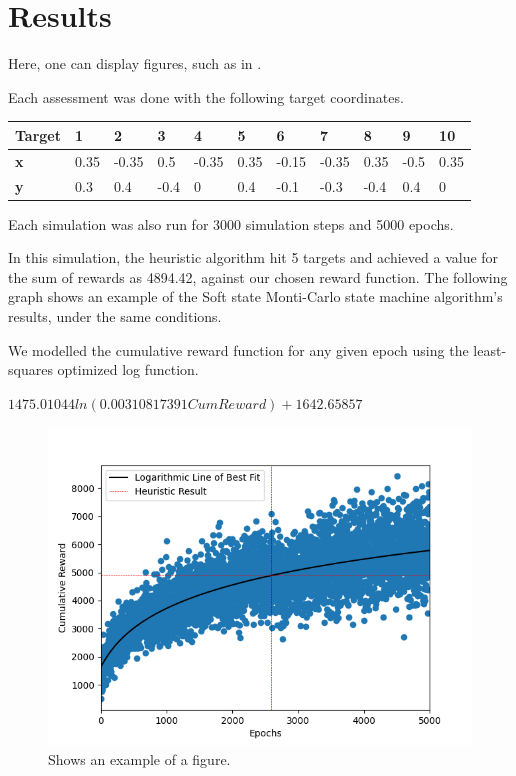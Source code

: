 \section{Results}

Here, one can display figures, such as in .

Each assessment was done with the following target coordinates.

\begin{table}[]
    \begin{tabular}{|l|l|l|l|l|l|l|l|l|l|l|}
    \hline
    \textbf{Target} & \textbf{1} & \textbf{2} & \textbf{3} & \textbf{4} & \textbf{5} & \textbf{6} & \textbf{7} & \textbf{8} & \textbf{9} & \textbf{10} \\ \hline
    \textbf{x}      & 0.35       & -0.35      & 0.5        & -0.35      & 0.35       & -0.15      & -0.35      & 0.35       & -0.5       & 0.35        \\ \hline
    \textbf{y}      & 0.3        & 0.4        & -0.4       & 0          & 0.4        & -0.1       & -0.3       & -0.4       & 0.4        & 0           \\ \hline
    \end{tabular}
\end{table}

Each simulation was also run for 3000 simulation steps and 5000 epochs.

In this simulation, the heuristic algorithm hit 5 targets and achieved a value for the sum of rewards as 4894.42, against our chosen reward function.
The following graph shows an example of the Soft state Monti-Carlo state machine algorithm’s results, under the same conditions.

We modelled the cumulative reward function for any given epoch using the least-squares optimized log function.

$1475.01044ln(0.00310817391CumReward) + 1642.65857$




\begin{figure}
    \centering
    \includegraphics[width=\singlefigure]{figures/figure_2.png}
    \caption{\label{fig:example} Shows an example of a figure.}
\end{figure}

